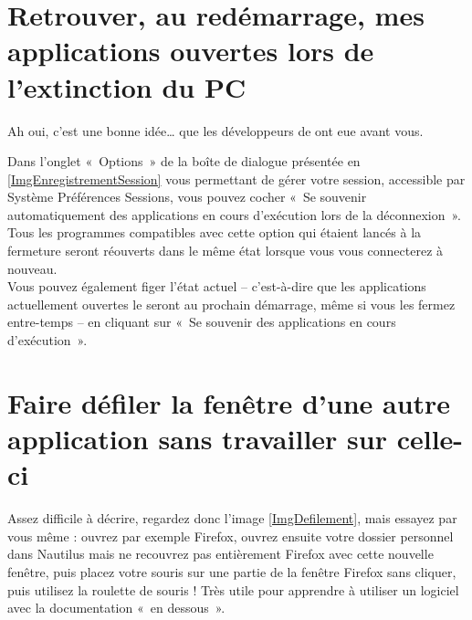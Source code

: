\section{Retrouver, au redémarrage, mes applications ouvertes lors de l'extinction du PC}
\label{RefEnrSession}
Ah oui, c'est une bonne idée\ldots{} que les développeurs de  ont eue avant vous.\par
Dans l'onglet «~Options~» de la boîte de dialogue présentée en \ref{ImgEnregistrementSession} vous permettant de gérer votre session, accessible par Système \FlecheDroite Préférences \FlecheDroite Sessions, vous pouvez cocher «~Se souvenir automatiquement des applications en cours d'exécution lors de la déconnexion~». Tous les programmes compatibles avec cette option qui étaient lancés à la fermeture seront réouverts dans le même état lorsque vous vous connecterez à nouveau.\\
Vous pouvez également figer l'état actuel -- c'est-à-dire que les applications actuellement ouvertes le seront au prochain démarrage, même si vous les fermez entre-temps -- en cliquant sur «~Se souvenir des applications en cours d'exécution~».
\section{Faire défiler la fenêtre d'une autre application sans travailler sur celle-ci}
Assez difficile à décrire, regardez donc l'image \ref{ImgDefilement}, mais essayez par vous même : ouvrez par exemple Firefox, ouvrez ensuite votre dossier personnel dans Nautilus mais ne recouvrez pas entièrement Firefox avec cette nouvelle fenêtre, puis placez votre souris sur une partie de la fenêtre Firefox sans cliquer, puis utilisez la roulette de souris ! Très utile pour apprendre à utiliser un logiciel avec la documentation «~en dessous~».
